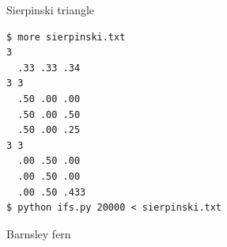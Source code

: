 \documentclass[8pt,a4paper,compress]{beamer}
\begin{document}
\begin{frame}[fragile]
\pause

Sierpinski triangle

\begin{minipage}{160pt}
\begin{lstlisting}[language={}]
$ more sierpinski.txt
3   
  .33 .33 .34 
3 3 
  .50 .00 .00 
  .50 .00 .50 
  .50 .00 .25 
3 3 
  .00 .50 .00 
  .00 .50 .00 
  .00 .50 .433 
$ python ifs.py 20000 < sierpinski.txt
\end{lstlisting}
\end{minipage}%
\begin{minipage}{140pt}
\begin{center}
\hfill {}
\end{center}
\end{minipage}

\pause
\bigskip

Barnsley fern


\end{frame}
\end{document}
